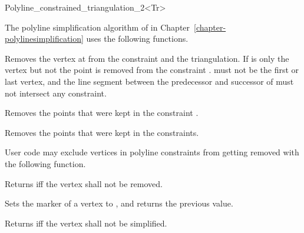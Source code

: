 \begin{ccRefClass}{Polyline_constrained_triangulation_2<Tr>}



The polyline simplification algorithm of in Chapter~\ref{chapter-polylinesimplification}
uses the following functions.

{Removes the vertex at  from the constraint and the triangulation.
If  is  only the vertex but not the point is removed from the constraint .
\ccPrecond {} must not be the first or last vertex, and the line segment between the predecessor and 
successor of  must not intersect any constraint.} 

{Removes the points that were kept in the constraint .}

{Removes the points that were kept in the constraints.}

User code may exclude vertices in polyline constraints from getting removed with 
the following function.

{Returns  iff the vertex shall not be removed.}

{Sets the marker of a vertex to , and returns the previous value.}

{Returns  iff the vertex shall not be simplified.}



\ccSeeAlso
{} \\
 \\
 \\
 \\

\end{ccRefClass}

